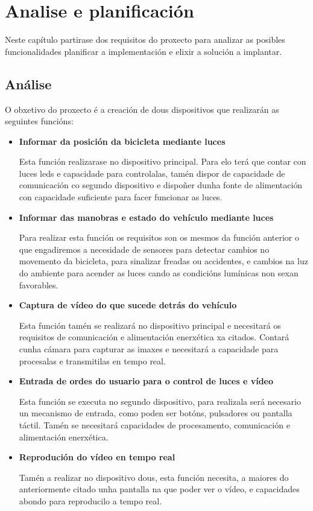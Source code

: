 \chapter{Analise e planificación}
\label{chap:Analise e planificación}
Neste capítulo partirase dos requisitos do proxecto para analizar as posibles funcionalidades planificar a implementación e elixir a solución a implantar.

\section{Análise}
O obxetivo do proxecto é a creación de dous dispositivos que realizarán as seguintes funcións:
\begin{itemize}
    \item\textbf{Informar da posición da bicicleta mediante luces}

Esta función realizarase no dispositivo principal. Para elo terá que contar con luces leds e capacidade para controlalas, tamén dispor de capacidade de comunicación co segundo dispositivo e dispoñer dunha fonte de alimentación con capacidade suficiente para facer funcionar as luces.\\

    \item\textbf{Informar das manobras e estado do vehículo mediante luces}

Para realizar esta función os requisitos son os mesmos da función anterior o que engadiremos a necesidade de sensores para detectar cambios no movemento da bicicleta, para sinalizar freadas ou accidentes, e cambios na luz do ambiente para acender as luces cando as condicións lumínicas non sexan favorables.\\

    \item\textbf{Captura de vídeo do que sucede detrás do vehículo}

Esta función tamén se realizará no dispositivo principal e necesitará os requisitos de comunicación e alimentación enerxética xa citados. Contará cunha cámara para capturar as imaxes e necesitará a capacidade para procesalas e transmitilas en tempo real.\\

    \item\textbf{Entrada de ordes do usuario para o control de luces e vídeo}

Esta función se executa no segundo dispositivo, para realizala será necesario un mecanismo de entrada, como poden ser botóns, pulsadores ou pantalla táctil. Tamén se necesitará capacidades de procesamento, comunicación e alimentación enerxética.\\

    \item\textbf{Reprodución do vídeo en tempo real}

Tamén a realizar no dispositivo dous, esta función necesita, a maiores do anteriormente citado unha pantalla na que poder ver o vídeo, e capacidades abondo para reproducilo a tempo real.
\end{itemize}

